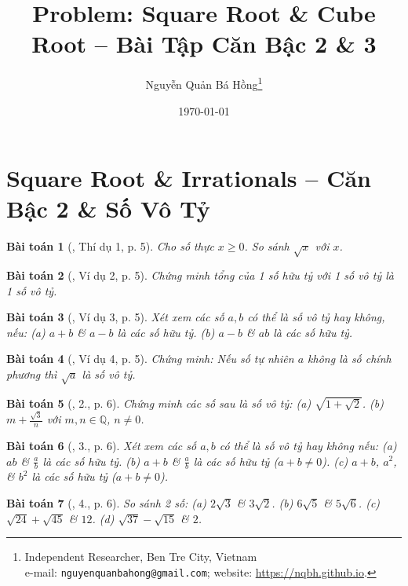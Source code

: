 \documentclass{article}
\title{Problem: Square Root \& Cube Root -- Bài Tập Căn Bậc 2 \& 3}
\author{Nguyễn Quản Bá Hồng\footnote{Independent Researcher, Ben Tre City, Vietnam\\e-mail: \texttt{nguyenquanbahong@gmail.com}; website: \url{https://nqbh.github.io}.}}
\date{\today}
\newtheorem{baitoan}{Bài toán}
\begin{document}
\maketitle
\begin{abstract}
	
\end{abstract}
\tableofcontents


\section{Square Root \& Irrationals -- Căn Bậc 2 \& Số Vô Tỷ}

\begin{baitoan}[\cite{Tuyen_Toan_9}, Thí dụ 1, p. 5]
	Cho số thực $x\ge0$. So sánh $\sqrt{x}$ với $x$.
\end{baitoan}

\begin{baitoan}[\cite{Binh_Toan_9_tap_1}, Ví dụ 2, p. 5]
	Chứng minh tổng của 1 số hữu tỷ với 1 số vô tỷ là 1 số vô tỷ.
\end{baitoan}

\begin{baitoan}[\cite{Binh_Toan_9_tap_1}, Ví dụ 3, p. 5]
	Xét xem các số $a,b$ có thể là số vô tỷ hay không, nếu: (a) $a + b$ \& $a - b$ là các số hữu tỷ. (b) $a - b$ \& $ab$ là các số hữu tỷ.
\end{baitoan}

\begin{baitoan}[\cite{Binh_Toan_9_tap_1}, Ví dụ 4, p. 5]
	Chứng minh: Nếu số tự nhiên $a$ không là số chính phương thì $\sqrt{a}$ là số vô tỷ.
\end{baitoan}

\begin{baitoan}[\cite{Binh_Toan_9_tap_1}, 2., p. 6]
	Chứng minh các số sau là số vô tỷ: (a) $\sqrt{1 + \sqrt{2}}$. (b) $m + \frac{\sqrt{3}}{n}$ với $m,n\in\mathbb{Q}$, $n\ne0$.
\end{baitoan}

\begin{baitoan}[\cite{Binh_Toan_9_tap_1}, 3., p. 6]
	Xét xem các số $a,b$ có thể là số vô tỷ hay không nếu: (a) $ab$ \& $\frac{a}{b}$ là các số hữu tỷ. (b) $a + b$ \& $\frac{a}{b}$ là các số hữu tỷ ($a + b\ne0$). (c) $a + b$, $a^2$, \& $b^2$ là các số hữu tỷ ($a + b\ne0$).
\end{baitoan}

\begin{baitoan}[\cite{Binh_Toan_9_tap_1}, 4., p. 6]
	So sánh 2 số: (a) $2\sqrt{3}$ \& $3\sqrt{2}$. (b) $6\sqrt{5}$ \& $5\sqrt{6}$. (c) $\sqrt{24} + \sqrt{45}$ \& $12$. (d) $\sqrt{37} - \sqrt{15}$ \& $2$.
\end{baitoan}
\end{document}
